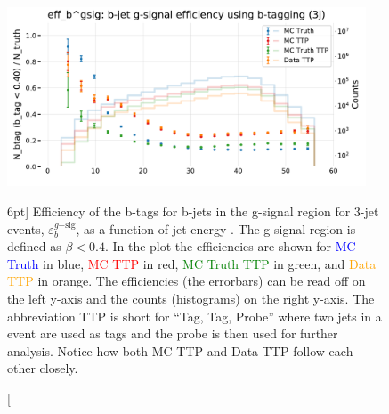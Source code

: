 \documentclass[a4paper, twoside, nobib]{tufte-book}
\newcommand{\code}[1]{\colorbox{light-gray}{\texttt{\detokenize{#1}}}}
\newcommand{\q}[1]{``#1''}
\begin{document}
\begin{figure}
  \includegraphics[width=0.95\textwidth, trim=0 0 0 40, clip]{figures/quarks/eff_b_gsig-down_sample=1.00-ML_vars=vertex-selection=b-ejet_min=4-n_iter_RS_lgb=99-n_iter_RS_xgb=9-cdot_cut=0.90-version=19.pdf}
  \caption[b-Tagging Efficiency $\varepsilon_b^{g\mathrm{-sig}}$ as a function of jet energy][6pt]
          {Efficiency of the b-tags for b-jets in the g-signal region for 3-jet events, $\varepsilon_b^{g\mathrm{-sig}}$, as a function of jet energy \code{Ejet}. The g-signal region is defined as $\beta < 0.4$. In the plot the efficiencies are shown for \textcolor{blue}{MC Truth} in blue, \textcolor{red}{MC TTP} in red, \textcolor{green}{MC Truth TTP} in green, and \textcolor{orange}{Data TTP} in orange. The efficiencies (the errorbars) can be read off on the left y-axis and the counts (histograms) on the right y-axis. The abbreviation TTP is short for \q{Tag, Tag, Probe} where two jets in a event are used as tags and the probe is then used for further analysis. Notice how both MC TTP and Data TTP follow each other closely.  
          } 
  \label{fig:q:effiency_btag_bjet_gsig}
\end{figure}
\end{document}

